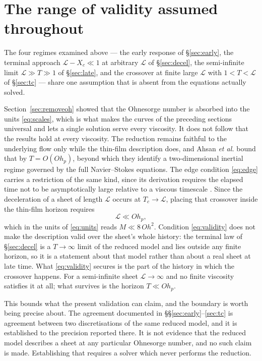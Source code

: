 \documentclass[11pt,a4paper]{article}
\newcommand{\Xc}{X_{c}}
\newcommand{\Tc}{T_{c}}
\begin{document}
\section{The range of validity assumed throughout}
\label{sec:validity}

The four regimes examined above --- the early response of \S\ref{sec:early},
the terminal approach $\mathcal{L} - \Xc \ll 1$ at arbitrary $\mathcal{L}$ of
\S\ref{sec:decel}, the semi-infinite limit $\mathcal{L} \gg T \gg 1$ of
\S\ref{sec:late}, and the crossover at finite large $\mathcal{L}$ with
$1 < T < \mathcal{L}$ of \S\ref{sec:tc} --- share one assumption that is absent
from the equations actually solved.

Section~\ref{sec:removeoh} showed that the Ohnesorge number is absorbed into
the units \eqref{eq:scales}, which is what makes the curves of the preceding
sections universal and lets a single solution serve every viscosity. It does
not follow that the results hold at every viscosity. The reduction remains
faithful to the underlying flow only while the thin-film description does, and
Ahsan \textit{et al.} \cite{ahsan2025} bound that by $T = O(Oh_{p})$, beyond which they identify a
two-dimensional inertial regime governed by the full Navier--Stokes equations.
The edge condition \eqref{eq:edge} carries a restriction of the same kind, since
its derivation requires the elapsed time not to be asymptotically large
relative to a viscous timescale \cite{ahsan2025}. Since the deceleration of a
sheet of length $\mathcal{L}$ occurs at $\Tc \to \mathcal{L}$, placing that
crossover inside the thin-film horizon requires
%
\begin{equation}
  \mathcal{L} \ll Oh_{p},
  \label{eq:validity}
\end{equation}
%
which in the units of \eqref{eq:units} reads $M \ll 8\,Oh^{2}$. Condition
\eqref{eq:validity} does not make the description valid over the sheet's whole
history: the terminal law of \S\ref{sec:decel} is a $T \to \infty$ limit of
the reduced model and lies outside any finite horizon, so it is a statement
about that model rather than about a real sheet at late time. What
\eqref{eq:validity} secures is the part of the history in which the crossover
happens. For a semi-infinite sheet $\mathcal{L} \to \infty$ and no finite
viscosity satisfies it at all; what survives is the horizon $T \ll Oh_{p}$.

This bounds what the present validation can claim, and the boundary is worth
being precise about. The agreement documented in \S\S\ref{sec:early}--\ref{sec:tc}
is agreement between two discretisations of the same reduced model, and it is
established to the precision reported there. It is not evidence that the
reduced model describes a sheet at any particular Ohnesorge number, and no such
claim is made. Establishing that requires a solver which never performs the
reduction.
\end{document}
